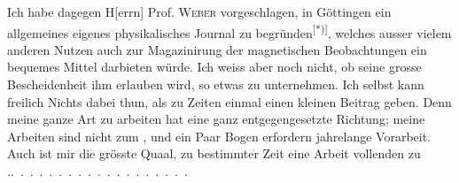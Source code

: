 Ich habe dagegen H[errn] Prof. \textsc{Weber} vorgeschlagen, in Göttingen ein
allgemeines eigenes physikalisches Journal zu begründen\textsuperscript{[*)]}, welches ausser
vielem anderen Nutzen auch zur Magazinirung der magnetischen Beobachtungen
ein bequemes Mittel darbieten würde. Ich weiss aber noch nicht, ob seine
grosse Bescheidenheit ihm erlauben wird, so etwas zu unternehmen. Ich selbst
kann freilich Nichts dabei thun, als zu Zeiten einmal einen kleinen Beitrag
geben. Denn meine ganze Art zu arbeiten hat eine ganz entgegengesetzte
Richtung; meine Arbeiten sind nicht zum , und ein Paar Bogen
erfordern jahrelange Vorarbeit. Auch ist mir die grösste Quaal, zu bestimmter
Zeit eine Arbeit vollenden zu .\quad .\ .\ .\ .\ .\ .\ .\ .\ .\ .\ .\ .\ .\ .\ .\ .\ .\ .\ .
\begingroup\renewcommand{\thefootnote}{}\endgroup
\clearpage\endgroup
